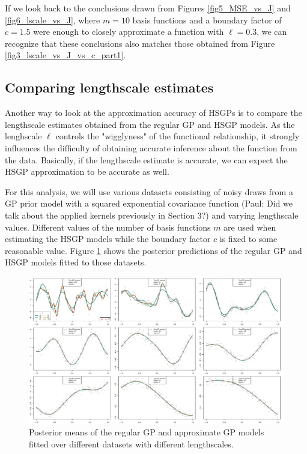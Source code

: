 \documentclass[]{interact}
\theoremstyle{plain}%
\theoremstyle{definition}
\theoremstyle{remark}
\begin{document}
If we look back to the conclusions drawn from Figures \ref{fig5_MSE_vs_J} and \ref{fig6_lscale_vs_J}, where $m = 10$ basis functions and a boundary factor of $c = 1.5$ were enough to closely approximate a function with $\ell = 0.3$, we can recognize that these conclusions also matches those obtained from Figure \ref{fig3_lscale_vs_J_vs_c_part1}.

\subsection{Comparing lengthscale estimates}

Another way to look at the approximation accuracy of HSGPs is to compare the lengthscale estimates
obtained from the regular GP and HSGP models. As the lenghscale $\ell$ controls the "wigglyness" of
the functional relationship, it strongly influences the difficulty of obtaining accurate
inference about the function from the data. Basically, if the lengthscale estimate is accurate, 
we can expect the HSGP approximation to be accurate as well.

For this analysis, we will use various datasets consisting of noisy draws from a GP prior model with a squared exponential covariance function (Paul: Did we talk about the applied kernels previously in Section 3?) and varying lengthscale values. Different values of the number of basis functions $m$ are used when estimating the HSGP models while the boundary factor $c$ is fixed to some reasonable value. Figure \ref{fig7_varing_lscale} shows the posterior predictions of the regular GP and HSGP models fitted to those datasets.

\begin{figure}
\centering
\includegraphics[width=\textwidth]{fig7_varing_lscale.pdf}
\caption{Posterior means of the regular GP and approximate GP models fitted over different datasets with different lengthscales.}
  \label{fig7_varing_lscale}
\end{figure}
\end{document}
